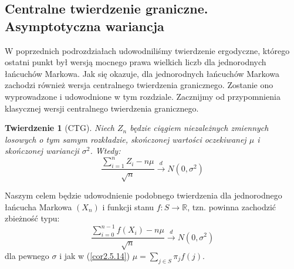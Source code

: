 \documentclass[a4paper]{article}
\theoremstyle{defn}
\theoremstyle{theorem}
\newtheorem{theorem}[defn]{Twierdzenie}
\theoremstyle{lemma}
\theoremstyle{cor}
\theoremstyle{fact}
\begin{document}
\subsection{Centralne twierdzenie graniczne. Asymptotyczna wariancja}
\label{sect2.6}
W poprzednich podrozdziałach udowodniliśmy twierdzenie ergodyczne, którego ostatni punkt był wersją mocnego prawa wielkich liczb dla jednorodnych łańcuchów Markowa. Jak się okazuje, dla jednorodnych łańcuchów Markowa zachodzi również wersja centralnego twierdzenia granicznego. Zostanie ono wyprowadzone i udowodnione w tym rozdziale. Zacznijmy od przypomnienia klasycznej wersji centralnego twierdzenia granicznego.\\

\begin{theorem}[CTG]\label{theorem2.6.1}
Niech $Z_n$ będzie ciągiem niezależnych zmiennych losowych o tym samym rozkładzie, skończonej wartości oczekiwanej $\mu$ i skończonej wariancji $\sigma^2$. Wtedy:
$$\frac{\sum\limits_{i=1}^n Z_i - n\mu}{\sqrt{n}} \overset{d}{\to} N(0, \sigma^2)$$
\end{theorem}
Naszym celem będzie udowodnienie podobnego twierdzenia dla jednorodnego łańcucha Markowa $(X_n)$ i funkcji stanu $f: S \to \mathbb{R}$, tzn. powinna zachodzić zbieżność typu:
$$ \frac{\sum\limits_{i=0}^{n-1} f(X_i) - n\mu}{\sqrt{n}} \overset{d}{\to} N(0, \sigma^2)$$
dla pewnego $\sigma$ i jak w (\ref{cor2.5.14}) $\mu = \sum\limits_{j \in S} \pi_j f(j)$.
\end{document}
